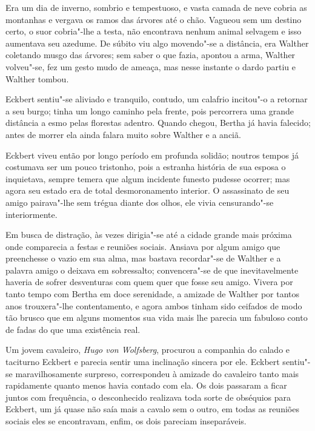  Era um dia de inverno, sombrio e tempestuoso, e vasta camada de neve
cobria as montanhas e vergava os ramos das árvores até o chão. Vagueou
sem um destino certo, o suor cobria"-lhe a testa, não encontrava nenhum
animal selvagem e isso aumentava seu azedume. De súbito viu algo
movendo"-se a distância, era Walther coletando musgo das árvores; sem
saber o que fazia, apontou a arma, Walther volveu"-se, fez um gesto mudo
de ameaça, mas nesse instante o dardo partiu e Walther tombou.

 Eckbert sentiu"-se aliviado e tranquilo, contudo, um calafrio incitou"-o
a retornar a seu burgo; tinha um longo caminho pela frente, pois
percorrera uma grande distância a esmo pelas florestas adentro. Quando
chegou, Bertha já havia falecido; antes de morrer ela ainda falara
muito sobre Walther e a anciã.

 Eckbert viveu então por longo período em profunda solidão; noutros
tempos já costumava ser um pouco tristonho, pois a estranha história de
sua esposa o inquietava, sempre temera que algum incidente \mbox{funesto}
pudesse ocorrer; mas agora seu estado era de total desmoronamento
interior. O assassinato de seu amigo pairava"-lhe sem trégua diante dos
olhos, ele vivia censurando"-se interiormente.

 Em busca de distração, às vezes dirigia"-se até a cidade grande mais
próxima onde comparecia a festas e reuniões sociais. Ansiava por algum
amigo que preenchesse o vazio em sua alma, mas bastava recordar"-se de
Walther e a palavra amigo o deixava em sobressalto; convencera"-se de
que inevitavelmente haveria de sofrer desventuras com quem quer que
fosse seu amigo. Vivera por tanto tempo com Bertha em doce serenidade,
a amizade de Walther por tantos anos trouxera"-lhe contentamento, e
agora ambos tinham sido ceifados de modo tão brusco que em alguns
momentos sua vida mais lhe parecia um fabuloso conto de fadas do que
uma existência real.

 Um jovem cavaleiro, \textit{Hugo von Wolfsberg}, procurou a companhia
do calado e taciturno Eckbert e parecia sentir uma inclinação sincera
por ele. Eckbert sentiu"-se maravilhosamente surpreso, correspondeu à
amizade do cavaleiro tanto mais rapidamente quanto menos havia contado
com ela. Os dois passaram a ficar juntos com frequência, o desconhecido
realizava toda sorte de obséquios para Eckbert, um já quase não saía
mais a cavalo sem o outro, em todas as reuniões sociais eles se
encontravam, enfim, os dois pareciam inseparáveis.


